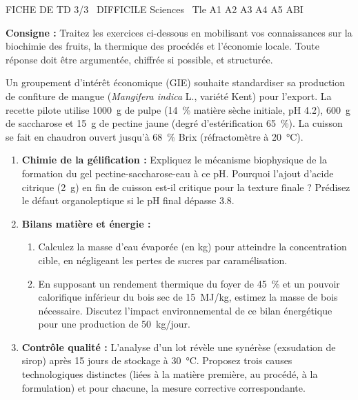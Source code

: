 \documentclass[11pt]{article}
\begin{document}
\begin{tcolorbox}[enhanced,colback=popink,colframe=popink,arc=10pt,boxrule=0pt,left=12pt,right=12pt,top=9pt,bottom=9pt]
{\color{white}\popxbold\small FICHE DE TD 3/3 \textbullet\ DIFFICILE \hfill Sciences \textbullet\ Tle A1 A2 A3 A4 A5 ABI\par}
\end{tcolorbox}
\vspace{4pt}
\noindent \textbf{Consigne :} Traitez les exercices ci-dessous en mobilisant vos connaissances sur la biochimie des fruits, la thermique des procédés et l'économie locale. Toute réponse doit être argumentée, chiffrée si possible, et structurée.

\begin{exercice}
Un groupement d'intérêt économique (GIE) souhaite standardiser sa production de confiture de mangue (\textit{Mangifera indica} L., variété Kent) pour l'export. La recette pilote utilise \SI{1000}{g} de pulpe (\SI{14}{\%} matière sèche initiale, pH \SI{4.2}{}), \SI{600}{g} de saccharose et \SI{15}{g} de pectine jaune (degré d'estérification \SI{65}{\%}). La cuisson se fait en chaudron ouvert jusqu'à \SI{68}{\%} Brix (réfractomètre à \SI{20}{\celsius}).

\begin{enumerate}
    \item \textbf{Chimie de la gélification :} Expliquez le mécanisme biophysique de la formation du gel pectine-saccharose-eau à ce pH. Pourquoi l'ajout d'acide citrique (\SI{2}{g}) en fin de cuisson est-il critique pour la texture finale ? Prédisez le défaut organoleptique si le pH final dépasse \SI{3.8}{}.
    \item \textbf{Bilans matière et énergie :} 
    \begin{enumerate}
        \item Calculez la masse d'eau évaporée (en kg) pour atteindre la concentration cible, en négligeant les pertes de sucres par caramélisation. 
        \item En supposant un rendement thermique du foyer de \SI{45}{\%} et un pouvoir calorifique inférieur du bois sec de \SI{15}{MJ/kg}, estimez la masse de bois nécessaire. Discutez l'impact environnemental de ce bilan énergétique pour une production de \SI{50}{kg/jour}.
    \end{enumerate}
    \item \textbf{Contrôle qualité :} L'analyse d'un lot révèle une synérèse (exsudation de sirop) après 15 jours de stockage à \SI{30}{\celsius}. Proposez trois causes technologiques distinctes (liées à la matière première, au procédé, à la formulation) et pour chacune, la mesure corrective correspondante.
\end{enumerate}
\end{exercice}
\end{document}
